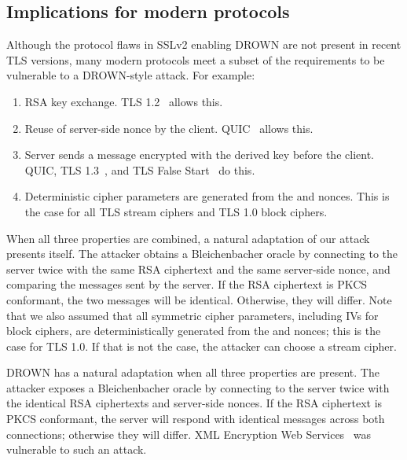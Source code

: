 \subsection{Implications for modern protocols}
Although the protocol flaws in SSLv2 enabling DROWN are not present in recent TLS versions, many modern protocols meet a subset of the requirements to be vulnerable to a DROWN-style attack. For example:
\begin{enumerate}
	\item RSA key exchange. TLS 1.2~\cite{rfc5246} allows this.
	\item Reuse of server-side nonce by the client. QUIC~\cite{langley2014quic} allows this.
	\item Server sends a message encrypted with the derived key before the client. QUIC, TLS 1.3~\cite{TLS1_3}, and TLS False Start~\cite{FalseStart} do this.
	\item Deterministic cipher parameters are generated from the \pms and nonces. This is the case for all TLS stream ciphers and TLS 1.0 block ciphers.
\end{enumerate}

When all three properties are combined, a natural adaptation of our attack presents itself.
The attacker obtains a Bleichenbacher oracle by connecting to the server twice with the same RSA ciphertext and the same server-side nonce, and comparing the messages sent by the server.
If the RSA ciphertext is PKCS conformant, the two messages will be identical.
Otherwise, they will differ.
Note that we also assumed that all symmetric cipher parameters, including IVs for block ciphers, are deterministically generated from the \pms and nonces; this is the case for TLS 1.0.
If that is not the case, the attacker can choose a stream cipher.
\fi

DROWN has a natural adaptation when all three properties are present. The attacker exposes a Bleichenbacher oracle by connecting to the server twice with the identical RSA ciphertexts and server-side nonces. If the RSA ciphertext is PKCS conformant, the server will respond with identical messages across both connections; otherwise they will differ.
\ifext
XML Encryption Web Services~\cite{Jager2012} was vulnerable to such an
attack.
\fi


